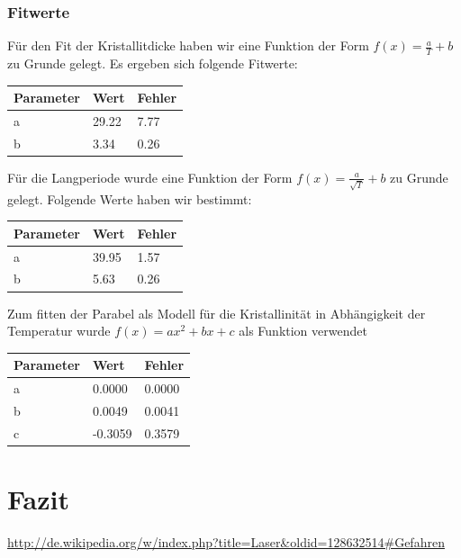 \documentclass[bigchapter,colorback,accentcolor=tud4b,linedtoc,11pt]{tudreport}
\begin{document}
\clearpage{}
\subsection{Fitwerte}

Für den Fit der Kristallitdicke haben wir eine Funktion der Form $f\left(x\right) = \frac{a}{T} + b$ zu Grunde gelegt. Es ergeben sich folgende Fitwerte:
\begin{center}
  \begin{tabular}{|p{1.5cm}|p{1.5cm}|p{1.5cm}|}
    \hline
    Parameter & Wert    & Fehler \\ \hline
    a         & 29.22   & 7.77   \\ \hline
    b         & 3.34    & 0.26   \\ \hline
	\end{tabular}
\end{center}

Für die Langperiode wurde eine Funktion der Form $f\left(x\right)  = \frac{a}{\sqrt{T}} + b$ zu Grunde gelegt. Folgende Werte haben wir bestimmt:
\begin{center}
  \begin{tabular}{|p{1.5cm}|p{1.5cm}|p{1.5cm}|}
    \hline
    Parameter & Wert    & Fehler \\ \hline
    a         & 39.95   & 1.57   \\ \hline
    b         & 5.63    & 0.26   \\ \hline
	\end{tabular}
\end{center}

Zum fitten der Parabel als Modell für die Kristallinität in Abhängigkeit der Temperatur wurde $f\left(x\right)  = ax^2 + bx + c$ als Funktion verwendet

\begin{center}
  \begin{tabular}{|p{1.5cm}|p{1.5cm}|p{1.5cm}|}
    \hline
    Parameter & Wert    & Fehler \\ \hline
    a         & 0.0000  & 0.0000 \\ \hline
    b         & 0.0049  & 0.0041 \\ \hline
    c         & -0.3059 & 0.3579 \\ \hline
	\end{tabular}
\end{center}

\chapter{Fazit}

\cleardoublepage{}
\newpage
\begin{thebibliography}{100}
   \url{http://de.wikipedia.org/w/index.php?title=Laser&oldid=128632514#Gefahren}
\end{thebibliography}
\end{document}
